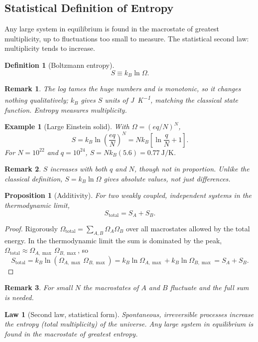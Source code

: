 \documentclass{article}
\newtheorem{law}{Law}
\newtheorem{definition}{Definition}
\newtheorem*{example}{Example}
\newtheorem{remark}{Remark}
\newtheorem{proposition}{Proposition}
\begin{document}
\subsection{Statistical Definition of Entropy}
Any large system in equilibrium is found in the macrostate of greatest multiplicity, up to fluctuations too small to measure. The statistical second law: multiplicity tends to increase.

\begin{definition}[Boltzmann entropy]
    \[S \equiv k_B \ln \Omega.\]
\end{definition}
\begin{remark}
    The log tames the huge numbers and is monotonic, so it changes nothing qualitatively; $k_B$ gives $S$ units of \si{\joule\per\kelvin}, matching the classical state function. Entropy measures multiplicity.
\end{remark}

\begin{example}[Large Einstein solid]
    With $\Omega = (eq/N)^N$,
    \[S = k_B \ln\left(\frac{eq}{N}\right)^N = Nk_B\left[\ln\frac{q}{N} + 1\right].\]
    For $N = 10^{22}$ and $q = 10^{24}$, $S = Nk_B(5.6) = \SI{0.77}{\joule\per\kelvin}$.
\end{example}
\begin{remark}
    $S$ increases with both $q$ and $N$, though not in proportion. Unlike the classical definition, $S = k_B\ln\Omega$ gives absolute values, not just differences.
\end{remark}

\begin{proposition}[Additivity]
    For two weakly coupled, independent systems in the thermodynamic limit,
    \[S_{\text{total}} = S_A + S_B.\]
\end{proposition}
\begin{proof}
    Rigorously $\Omega_{\text{total}} = \sum_{A,B}\Omega_A\Omega_B$ over all macrostates allowed by the total energy. In the thermodynamic limit the sum is dominated by the peak, $\Omega_{\text{total}} \approx \Omega_{A,\max}\,\Omega_{B,\max}$, so
    \[S_{\text{total}} = k_B\ln\left(\Omega_{A,\max}\,\Omega_{B,\max}\right) = k_B\ln\Omega_{A,\max} + k_B\ln\Omega_{B,\max} = S_A + S_B.\]
\end{proof}
\begin{remark}
    For small $N$ the macrostates of $A$ and $B$ fluctuate and the full sum is needed.
\end{remark}

\begin{law}[Second law, statistical form]
    Spontaneous, irreversible processes increase the entropy (total multiplicity) of the universe. Any large system in equilibrium is found in the macrostate of greatest entropy.
\end{law}
\end{document}
